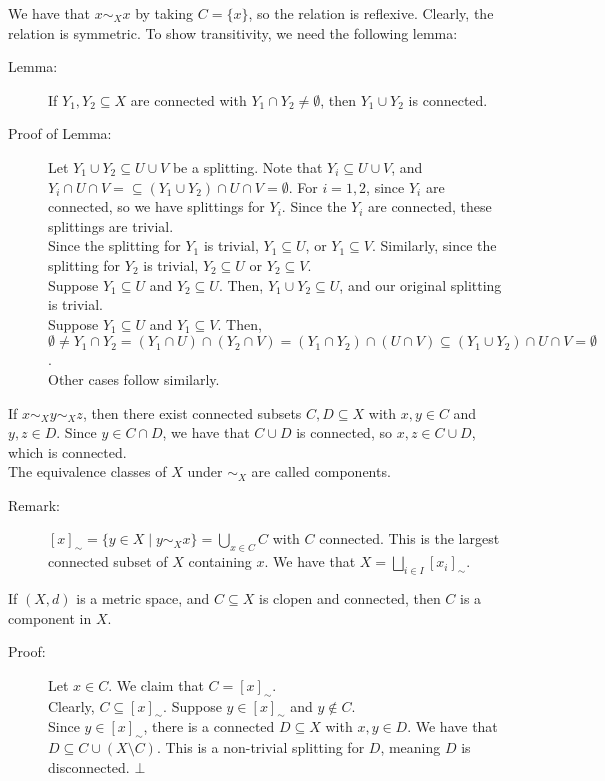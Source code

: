 \documentclass[10pt]{extarticle}
\begin{document}
  We have that $x\sim_{X}x$ by taking $C = \{x\}$, so the relation is reflexive. Clearly, the relation is symmetric. To show transitivity, we need the following lemma:
  \begin{description}
    \item[Lemma:] If $Y_1,Y_2\subseteq X$ are connected with $Y_1\cap Y_2\neq \emptyset$, then $Y_1\cup Y_2$ is connected.
    \item[Proof of Lemma:] Let $Y_1\cup Y_2\subseteq U\cup V$ be a splitting. Note that $Y_i \subseteq U\cup V$, and $Y_i \cap U\cap V = \subseteq (Y_1\cup Y_2)\cap U \cap V =\emptyset$. For $i=1,2$, since $Y_i$ are connected, so we have splittings for $Y_i$. Since the $Y_i$ are connected, these splittings are trivial.\\

      Since the splitting for $Y_1$ is trivial, $Y_1\subseteq U$, or $Y_1\subseteq V$. Similarly, since the splitting for $Y_2$ is trivial, $Y_2\subseteq U$ or $Y_2\subseteq V$.\\

      Suppose $Y_1\subseteq U$ and $Y_2\subseteq U$. Then, $Y_1\cup Y_2\subseteq U$, and our original splitting is trivial.\\

      Suppose $Y_1\subseteq U$ and $Y_1\subseteq V$. Then, $\emptyset \neq Y_1 \cap Y_2 = (Y_1\cap U)\cap (Y_2\cap V) = (Y_1\cap Y_2)\cap (U\cap V)\subseteq (Y_1\cup Y_2)\cap U\cap V = \emptyset$.\\

      Other cases follow similarly.
  \end{description}
  If $x\sim_{X}y\sim_{X}z$, then there exist connected subsets $C,D\subseteq X$ with $x,y\in C$ and $y,z\in D$. Since $y\in C\cap D$, we have that $C\cup D$ is connected, so $x,z\in C\cup D$, which is connected.\\

  The equivalence classes of $X$ under $\sim_{X}$ are called components.
  \begin{description}
    \item[Remark:] $[x]_{\sim} = \{y\in X\mid y\sim_{X}x\} = \bigcup_{x\in C} C $ with $C$ connected. This is the largest connected subset of $X$ containing $x$. We have that $X = \bigsqcup_{i\in I}[x_i]_{\sim}$.
  \end{description}
  If $(X,d)$ is a metric space, and $C\subseteq X$ is clopen and connected, then $C$ is a component in $X$.
  \begin{description}
    \item[Proof:] Let $x\in C$. We claim that $C = [x]_{\sim}$.\\

      Clearly, $C\subseteq [x]_{\sim}$. Suppose $y\in [x]_{\sim}$ and $y\notin C$.\\

      Since $y\in [x]_{\sim}$, there is a connected $D\subseteq X$ with $x,y\in D$. We have that $D\subseteq C\cup (X\setminus C)$. This is a non-trivial splitting for $D$, meaning $D$ is disconnected. $\bot$
  \end{description}
\end{document}

